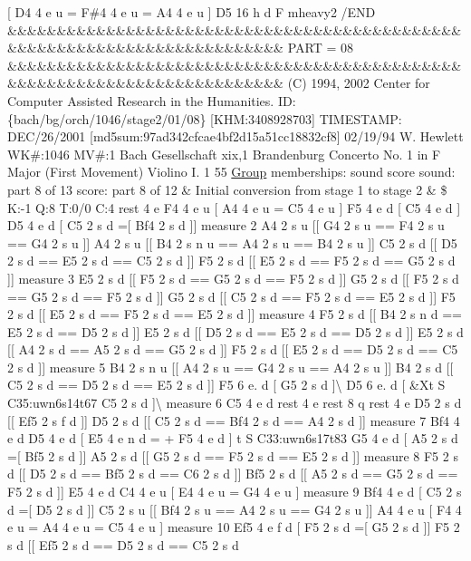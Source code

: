 \mbox{[} D4 4 e u = F\#4 4 e u = A4 4 e u \mbox{]} D5 16 h d F mheavy2 /\+E\+ND \&\&\&\&\&\&\&\&\&\&\&\&\&\&\&\&\&\&\&\&\&\&\&\&\&\&\&\&\&\&\&\&\&\&\&\&\&\&\&\&\&\&\&\&\&\&\&\&\&\&\&\&\&\&\&\&\&\&\&\&\&\&\&\&\&\&\&\&\&\&\&\&\&\& P\+A\+RT = 08 \&\&\&\&\&\&\&\&\&\&\&\&\&\&\&\&\&\&\&\&\&\&\&\&\&\&\&\&\&\&\&\&\&\&\&\&\&\&\&\&\&\&\&\&\&\&\&\&\&\&\&\&\&\&\&\&\&\&\&\&\&\&\&\&\&\&\&\&\&\&\&\&\&\& (C) 1994, 2002 Center for Computer Assisted Research in the Humanities. ID\+: \{bach/bg/orch/1046/stage2/01/08\} \mbox{[}K\+HM\+:3408928703\mbox{]} T\+I\+M\+E\+S\+T\+A\+MP\+: D\+E\+C/26/2001 \mbox{[}md5sum\+:97ad342cfcae4bf2d15a51cc18832cf8\mbox{]} 02/19/94 W. Hewlett WK\#\+:1046 MV\#\+:1 Bach Gesellschaft xix,1 Brandenburg Concerto No. 1 in F Major (First Movement) Violino I. 1 55 \hyperlink{class_group}{Group} memberships\+: sound score sound\+: part 8 of 13 score\+: part 8 of 12 \& Initial conversion from stage 1 to stage 2 \& \$ K\+:-\/1 Q\+:8 T\+:0/0 C\+:4 rest 4 e F4 4 e u \mbox{[} A4 4 e u = C5 4 e u \mbox{]} F5 4 e d \mbox{[} C5 4 e d \mbox{]} D5 4 e d \mbox{[} C5 2 s d =\mbox{[} Bf4 2 s d \mbox{]}\mbox{]} measure 2 A4 2 s u \mbox{[}\mbox{[} G4 2 s u == F4 2 s u == G4 2 s u \mbox{]}\mbox{]} A4 2 s u \mbox{[}\mbox{[} B4 2 s n u == A4 2 s u == B4 2 s u \mbox{]}\mbox{]} C5 2 s d \mbox{[}\mbox{[} D5 2 s d == E5 2 s d == C5 2 s d \mbox{]}\mbox{]} F5 2 s d \mbox{[}\mbox{[} E5 2 s d == F5 2 s d == G5 2 s d \mbox{]}\mbox{]} measure 3 E5 2 s d \mbox{[}\mbox{[} F5 2 s d == G5 2 s d == F5 2 s d \mbox{]}\mbox{]} G5 2 s d \mbox{[}\mbox{[} F5 2 s d == G5 2 s d == F5 2 s d \mbox{]}\mbox{]} G5 2 s d \mbox{[}\mbox{[} C5 2 s d == F5 2 s d == E5 2 s d \mbox{]}\mbox{]} F5 2 s d \mbox{[}\mbox{[} E5 2 s d == F5 2 s d == E5 2 s d \mbox{]}\mbox{]} measure 4 F5 2 s d \mbox{[}\mbox{[} B4 2 s n d == E5 2 s d == D5 2 s d \mbox{]}\mbox{]} E5 2 s d \mbox{[}\mbox{[} D5 2 s d == E5 2 s d == D5 2 s d \mbox{]}\mbox{]} E5 2 s d \mbox{[}\mbox{[} A4 2 s d == A5 2 s d == G5 2 s d \mbox{]}\mbox{]} F5 2 s d \mbox{[}\mbox{[} E5 2 s d == D5 2 s d == C5 2 s d \mbox{]}\mbox{]} measure 5 B4 2 s n u \mbox{[}\mbox{[} A4 2 s u == G4 2 s u == A4 2 s u \mbox{]}\mbox{]} B4 2 s d \mbox{[}\mbox{[} C5 2 s d == D5 2 s d == E5 2 s d \mbox{]}\mbox{]} F5 6 e. d \mbox{[} G5 2 s d \mbox{]}\textbackslash{} D5 6 e. d \mbox{[} \&Xt S C35\+:uwn6s14t67 C5 2 s d \mbox{]}\textbackslash{} measure 6 C5 4 e d rest 4 e rest 8 q rest 4 e D5 2 s d \mbox{[}\mbox{[} Ef5 2 s f d \mbox{]}\mbox{]} D5 2 s d \mbox{[}\mbox{[} C5 2 s d == Bf4 2 s d == A4 2 s d \mbox{]}\mbox{]} measure 7 Bf4 4 e d D5 4 e d \mbox{[} E5 4 e n d = + F5 4 e d \mbox{]} t S C33\+:uwn6s17t83 G5 4 e d \mbox{[} A5 2 s d =\mbox{[} Bf5 2 s d \mbox{]}\mbox{]} A5 2 s d \mbox{[}\mbox{[} G5 2 s d == F5 2 s d == E5 2 s d \mbox{]}\mbox{]} measure 8 F5 2 s d \mbox{[}\mbox{[} D5 2 s d == Bf5 2 s d == C6 2 s d \mbox{]}\mbox{]} Bf5 2 s d \mbox{[}\mbox{[} A5 2 s d == G5 2 s d == F5 2 s d \mbox{]}\mbox{]} E5 4 e d C4 4 e u \mbox{[} E4 4 e u = G4 4 e u \mbox{]} measure 9 Bf4 4 e d \mbox{[} C5 2 s d =\mbox{[} D5 2 s d \mbox{]}\mbox{]} C5 2 s u \mbox{[}\mbox{[} Bf4 2 s u == A4 2 s u == G4 2 s u \mbox{]}\mbox{]} A4 4 e u \mbox{[} F4 4 e u = A4 4 e u = C5 4 e u \mbox{]} measure 10 Ef5 4 e f d \mbox{[} F5 2 s d =\mbox{[} G5 2 s d \mbox{]}\mbox{]} F5 2 s d \mbox{[}\mbox{[} Ef5 2 s d == D5 2 s d == C5 2 s d 